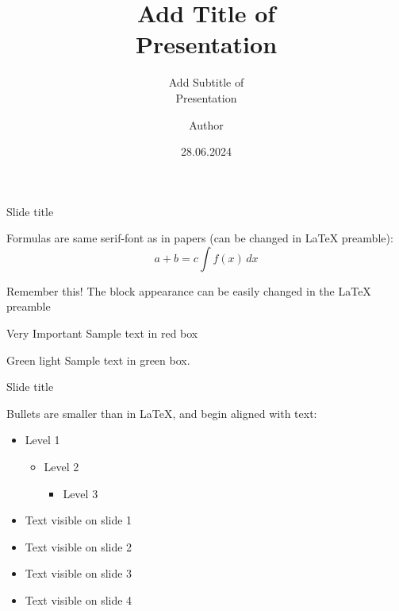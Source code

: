 \documentclass[aspectratio=169,t]{beamer}  %
\title[Short title]{Add Title of\\Presentation}
\subtitle{Add Subtitle of\\Presentation}
\author[Short author]{Author}
\date{28.06.2024}
\institute{Location}
\begin{document}
\begin{frame}[plain,c] %
 \titlepage
\end{frame}

\begin{frame}{Slide title}

Formulas are same serif-font as in papers (can be changed in LaTeX preamble):
\begin{equation}
    a + b = c \int f(x)\,dx
\end{equation}

\begin{block}{Remember this!}
The block appearance can be easily changed in the LaTeX preamble
\end{block}

\begin{alertblock}{Very Important}
Sample text in red box
\end{alertblock}

\begin{examples}{Green light}
Sample text in green box.
\end{examples}

\end{frame}

\begin{frame}{Slide title}

Bullets are smaller than in LaTeX, and begin aligned with text: 
\begin{itemize}
 \item Level 1
 \begin{itemize}
     \item Level 2
     \begin{itemize}
          \item Level 3
      \end{itemize}    
 \end{itemize}     
\end{itemize}

\begin{itemize}
 \item <1-> Text visible on slide 1
 \item <2-> Text visible on slide 2
 \item <3> Text visible on slide 3
 \item <4-> Text visible on slide 4
\end{itemize}

\end{frame}
\end{document}
